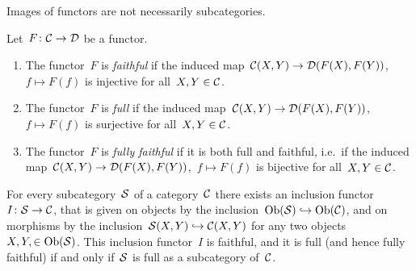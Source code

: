 \begin{warning*}
  Images of functors are not necessarily subcategories.
\end{warning*}


\begin{definition}[label=properties of functors]
  Let~$F \colon \mathcal{C} \to \mathcal{D}$ be a functor.
  \begin{enumerate}
    \item
      The functor~$F$ is \emph{faithful} if the induced map~$\mathcal{C}(X,Y) \to \mathcal{D}(F(X),F(Y))$,~$f \mapsto F(f)$ is injective for all~$X, Y \in \mathcal{C}$.
    \item
      The functor~$F$ is \emph{full} if the induced map~$\mathcal{C}(X,Y) \to \mathcal{D}(F(X),F(Y))$,~$f \mapsto F(f)$ is surjective for all~$X, Y \in \mathcal{C}$.
    \item
      The functor~$F$ is \emph{fully faithful} if it is both full and faithful, i.e.\ if the induced map~$\mathcal{C}(X,Y) \to \mathcal{D}(F(X),F(Y))$,~$f \mapsto F(f)$ is bijective for all~$X, Y \in \mathcal{C}$.
  \end{enumerate}
\end{definition}


\begin{example*}
  For every subcategory~$\mathcal{S}$ of a category~$\mathcal{C}$ there exists an inclusion functor~$I \colon \mathcal{S} \to \mathcal{C}$, that is given on objects by the inclusion~$\operatorname{Ob}(\mathcal{S}) \hookrightarrow \operatorname{Ob}(\mathcal{C})$, and on morphisms by the inclusion~$\mathcal{S}(X,Y) \hookrightarrow \mathcal{C}(X,Y)$ for any two objects~$X, Y, \in \operatorname{Ob}(\mathcal{S})$.
  This inclusion functor~$I$ is faithful, and it is full (and hence fully faithful) if and only if~$\mathcal{S}$ is full as a subcategory of~$\mathcal{C}$.
\end{example*}




